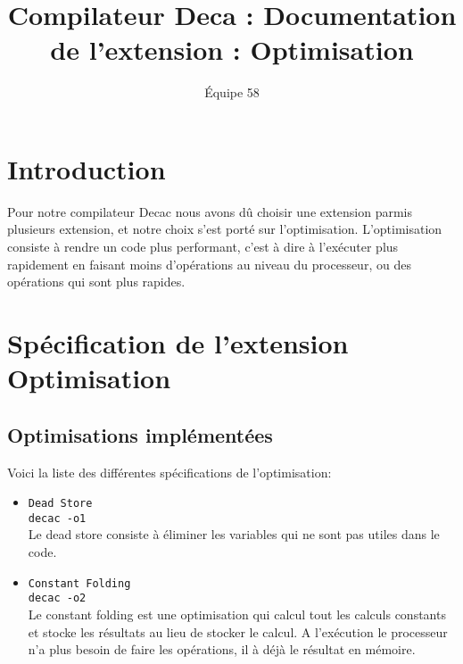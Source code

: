 \documentclass[a4paper]{article}
\begin{document}
\title{Compilateur Deca : Documentation de l'extension : Optimisation}
\author{\'Equipe 58}
\maketitle
\section{Introduction}
Pour notre compilateur Decac nous avons dû choisir une extension parmis plusieurs extension, et notre choix s'est porté sur l'optimisation. L'optimisation consiste à rendre un code plus performant, c'est à dire à l'exécuter plus rapidement en faisant moins d'opérations au niveau du processeur, ou des opérations qui sont plus rapides.
\section{Spécification de l'extension Optimisation}
\subsection{Optimisations implémentées}
Voici la liste des différentes spécifications de l'optimisation:
\begin{itemize}
\item \texttt{Dead Store} \\
      \texttt{decac -o1} \\
Le dead store consiste à éliminer les variables qui ne sont pas utiles dans le code.
\item \texttt{Constant Folding}\\
\texttt{decac -o2}\\
Le constant folding est une optimisation qui calcul tout les calculs constants et stocke les résultats au lieu de stocker le calcul. A l'exécution le processeur n'a plus besoin de faire les opérations, il à déjà le résultat en mémoire.
     \end{itemize}
\end{document}

